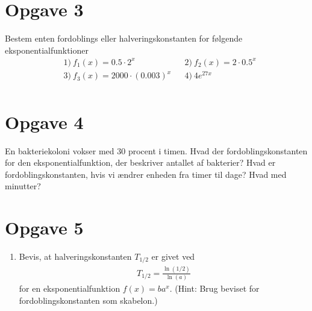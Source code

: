 \section*{Opgave 3}
Bestem enten fordoblings eller halveringskonstanten for følgende eksponentialfunktioner
\begin{align*}
&1) \ f_1(x) = 0.5\cdot 2^x   &&2) \ f_2(x)=2\cdot 0.5^x  \\
&3) \ f_3(x) = 2000\cdot(0.003)^x  &&4) \ 4e^{27x}  \\
\end{align*}
\section*{Opgave 4}
En bakteriekoloni vokser med $30$ procent i timen. Hvad der fordoblingskonstanten for den eksponentialfunktion, der beskriver antallet af bakterier? Hvad er fordoblingskonstanten, hvis vi ændrer enheden fra timer til dage? Hvad med minutter?

\section*{Opgave 5}
\begin{enumerate}[label=\roman*)]
\item Bevis, at halveringskonstanten $T_{1/2}$ er givet ved 
\begin{align*}
T_{1/2} = \frac{\ln(1/2)}{\ln(a)}
\end{align*}
for en eksponentialfunktion $f(x) = ba^x$. (Hint: Brug beviset for fordoblingskonstanten som skabelon.)
\end{enumerate}